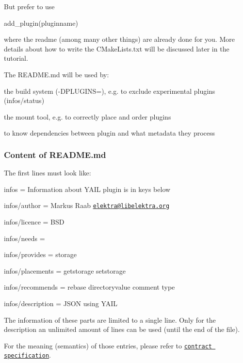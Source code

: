 But prefer to use \begin{DoxyVerb}    add_plugin(pluginname)
\end{DoxyVerb}


where the readme (among many other things) are already done for you. More details about how to write the C\+Make\+Lists.\+txt will be discussed later in the tutorial.

The {\ttfamily R\+E\+A\+D\+M\+E.\+md} will be used by\+:


\begin{DoxyItemize}
\item the build system ({\ttfamily -\/\+D\+P\+L\+U\+G\+I\+N\+S=}), e.\+g. to exclude experimental plugins ({\ttfamily infos/status})
\item the mount tool, e.\+g. to correctly place and order plugins
\item to know dependencies between plugin and what metadata they process
\end{DoxyItemize}

\subsubsection*{Content of R\+E\+A\+D\+M\+E.\+md}

The first lines must look like\+:


\begin{DoxyItemize}
\item infos = Information about Y\+A\+I\+L plugin is in keys below
\item infos/author = Markus Raab \href{mailto:elektra@libelektra.org}{\tt elektra@libelektra.\+org}
\item infos/licence = B\+S\+D
\item infos/needs =
\item infos/provides = storage
\item infos/placements = getstorage setstorage
\item infos/recommends = rebase directoryvalue comment type
\item infos/description = J\+S\+O\+N using Y\+A\+I\+L
\end{DoxyItemize}

The information of these parts are limited to a single line. Only for the description an unlimited amount of lines can be used (until the end of the file).

For the meaning (semantics) of those entries, please refer to \href{/home/markus/Projekte/Elektra/current/doc/CONTRACT.ini}{\tt contract specification}.

